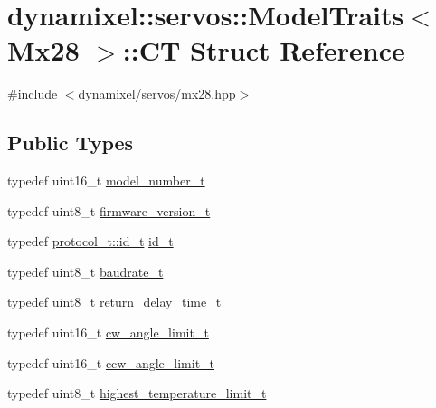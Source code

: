 \hypertarget{structdynamixel_1_1servos_1_1_model_traits_3_01_mx28_01_4_1_1_c_t}{}\section{dynamixel\+:\+:servos\+:\+:Model\+Traits$<$ Mx28 $>$\+:\+:C\+T Struct Reference}
\label{structdynamixel_1_1servos_1_1_model_traits_3_01_mx28_01_4_1_1_c_t}


{\ttfamily \#include $<$dynamixel/servos/mx28.\+hpp$>$}

\subsection*{Public Types}
\begin{DoxyCompactItemize}
\item 
typedef uint16\+\_\+t \hyperlink{structdynamixel_1_1servos_1_1_model_traits_3_01_mx28_01_4_1_1_c_t_aefe1a29d5146e147d135c1f0acb53505}{model\+\_\+number\+\_\+t}
\item 
typedef uint8\+\_\+t \hyperlink{structdynamixel_1_1servos_1_1_model_traits_3_01_mx28_01_4_1_1_c_t_a29a1406d5c42461a7c6a67f14a24995b}{firmware\+\_\+version\+\_\+t}
\item 
typedef \hyperlink{classdynamixel_1_1protocols_1_1_protocol1_a1d4dfa22b01f80b1876d14f539d52b5c}{protocol\+\_\+t\+::id\+\_\+t} \hyperlink{structdynamixel_1_1servos_1_1_model_traits_3_01_mx28_01_4_1_1_c_t_abeada4bb714b657c9e68b5659687719a}{id\+\_\+t}
\item 
typedef uint8\+\_\+t \hyperlink{structdynamixel_1_1servos_1_1_model_traits_3_01_mx28_01_4_1_1_c_t_a880f9df55e1318bbdd08349f2d37f943}{baudrate\+\_\+t}
\item 
typedef uint8\+\_\+t \hyperlink{structdynamixel_1_1servos_1_1_model_traits_3_01_mx28_01_4_1_1_c_t_acccaddb803e01784bbf2a188fb78d70c}{return\+\_\+delay\+\_\+time\+\_\+t}
\item 
typedef uint16\+\_\+t \hyperlink{structdynamixel_1_1servos_1_1_model_traits_3_01_mx28_01_4_1_1_c_t_a7df577b40348ee815a72655d99c36ea8}{cw\+\_\+angle\+\_\+limit\+\_\+t}
\item 
typedef uint16\+\_\+t \hyperlink{structdynamixel_1_1servos_1_1_model_traits_3_01_mx28_01_4_1_1_c_t_ac71e9003bdd4e822292228e7b14a852b}{ccw\+\_\+angle\+\_\+limit\+\_\+t}
\item 
typedef uint8\+\_\+t \hyperlink{structdynamixel_1_1servos_1_1_model_traits_3_01_mx28_01_4_1_1_c_t_a6da8442cdeb118bf11cf43248751f048}{highest\+\_\+temperature\+\_\+limit\+\_\+t}

\end{DoxyCompactItemize}
